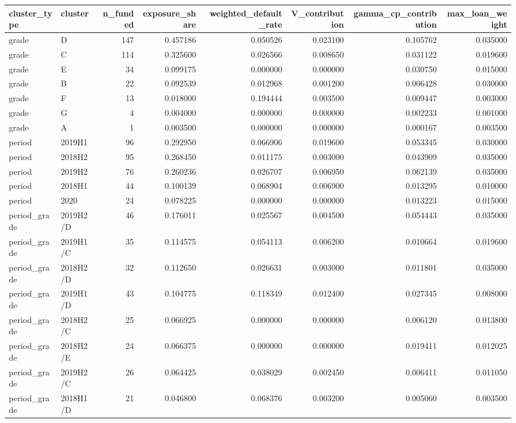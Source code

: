 \begin{tabular}{llrrrrrr}
\toprule
cluster\_type & cluster & n\_funded & exposure\_share & weighted\_default\_rate & V\_contribution & gamma\_cp\_contribution & max\_loan\_weight \\
\midrule
grade & D & 147 & 0.457186 & 0.050526 & 0.023100 & 0.105762 & 0.035000 \\
grade & C & 114 & 0.325600 & 0.026566 & 0.008650 & 0.031122 & 0.019600 \\
grade & E & 34 & 0.099175 & 0.000000 & 0.000000 & 0.030750 & 0.015000 \\
grade & B & 22 & 0.092539 & 0.012968 & 0.001200 & 0.006428 & 0.030000 \\
grade & F & 13 & 0.018000 & 0.194444 & 0.003500 & 0.009447 & 0.003000 \\
grade & G & 4 & 0.004000 & 0.000000 & 0.000000 & 0.002233 & 0.001000 \\
grade & A & 1 & 0.003500 & 0.000000 & 0.000000 & 0.000167 & 0.003500 \\
period & 2019H1 & 96 & 0.292950 & 0.066906 & 0.019600 & 0.053345 & 0.030000 \\
period & 2018H2 & 95 & 0.268450 & 0.011175 & 0.003000 & 0.043909 & 0.035000 \\
period & 2019H2 & 76 & 0.260236 & 0.026707 & 0.006950 & 0.062139 & 0.035000 \\
period & 2018H1 & 44 & 0.100139 & 0.068904 & 0.006900 & 0.013295 & 0.010000 \\
period & 2020 & 24 & 0.078225 & 0.000000 & 0.000000 & 0.013223 & 0.015000 \\
period\_grade & 2019H2/D & 46 & 0.176011 & 0.025567 & 0.004500 & 0.054443 & 0.035000 \\
period\_grade & 2019H1/C & 35 & 0.114575 & 0.054113 & 0.006200 & 0.010664 & 0.019600 \\
period\_grade & 2018H2/D & 32 & 0.112650 & 0.026631 & 0.003000 & 0.011801 & 0.035000 \\
period\_grade & 2019H1/D & 43 & 0.104775 & 0.118349 & 0.012400 & 0.027345 & 0.008000 \\
period\_grade & 2018H2/C & 25 & 0.066925 & 0.000000 & 0.000000 & 0.006120 & 0.013800 \\
period\_grade & 2018H2/E & 24 & 0.066375 & 0.000000 & 0.000000 & 0.019411 & 0.012025 \\
period\_grade & 2019H2/C & 26 & 0.064425 & 0.038029 & 0.002450 & 0.006411 & 0.011050 \\
period\_grade & 2018H1/D & 21 & 0.046800 & 0.068376 & 0.003200 & 0.005060 & 0.003500 \\

\end{tabular}
